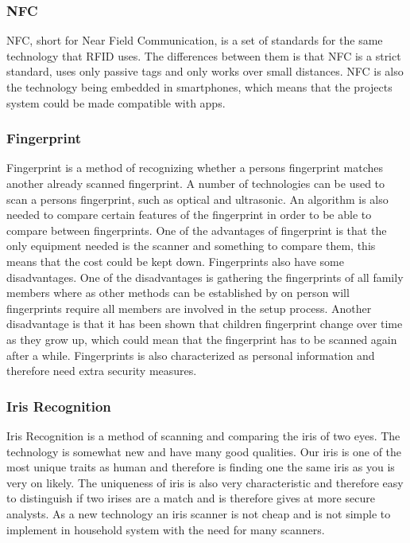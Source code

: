 \subsubsection{NFC}
NFC, short for Near Field Communication, is a set of standards for the same technology that RFID uses. The differences between them is that NFC is a strict standard, uses only passive tags and only works over small distances. NFC is also the technology being embedded in smartphones, which means that the projects system could be made compatible with apps.

\subsubsection{Fingerprint}
Fingerprint is a method of recognizing whether a persons fingerprint matches another already scanned fingerprint. A number of technologies can be used to scan a persons fingerprint, such as optical and ultrasonic. An algorithm is also needed to compare certain features of the fingerprint in order to be able to compare between fingerprints. One of the advantages of fingerprint is that the only equipment needed is the scanner and something to compare them, this means that the cost could be kept down. Fingerprints also have some disadvantages. One of the disadvantages is gathering the fingerprints of all family members where as other methods can be established by on person will fingerprints require all members are involved in the setup process. Another disadvantage is that it has been shown that children fingerprint change over time as they grow up, which could mean that the fingerprint has to be scanned again after a while. Fingerprints is also characterized as personal information and therefore need extra security measures. 

\subsubsection{Iris Recognition}
Iris Recognition is a method of scanning and comparing the iris of two eyes. The technology is somewhat new and have many good qualities. Our iris is one of the most unique traits as human and therefore is finding one the same iris as you is very on likely. The uniqueness of iris is also very characteristic and therefore easy to distinguish if two irises are a match and is therefore gives at more secure analysts\citep{irisid}. As a new technology an iris scanner is not cheap and is not simple to implement in household system with the need for many scanners.    

